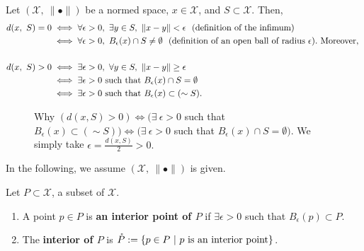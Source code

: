 \begin{lem} Let $\left(\mathcal{X},\ \| \bullet \|\right)$ be a normed space, $x\in\mathcal{X}$, and $S\subset\mathcal{X}$. Then,
    \begin{align*}
        d(x,\ S)=0 &\iff \forall\epsilon>0,\ \exists y\in S,\ \|x-y\|<\epsilon ~~(\text{definition of  the infimum})\\
        &\iff \forall\epsilon>0,\ B_\epsilon(x)\cap S\neq \emptyset ~~(\text{definition of an open ball of radius} ~\epsilon). \text{ Moreover, } \\
        \\
        d(x,\ S)>0 &\iff \exists\epsilon>0,\ \forall y\in S,\ \|x-y\|\geq\epsilon\\
        &\iff \exists\epsilon>0 \textnormal{ such that } B_\epsilon(x)\cap S = \emptyset\\
        &\iff  \exists\epsilon>0 \textnormal{ such that } B_\epsilon(x)\subset (\sim S).
    \end{align*}
\end{lem} 

\begin{figure}[hbt!]%
    \label{fig:DistanceZero2aSet}
\caption[]{ Why $(d(x, S)>0) \iff (\exists ~\epsilon>0$ such that $ B_\epsilon(x) \subset (\sim S)) \iff (\exists ~\epsilon>0$ such that $ B_\epsilon(x) \cap S = \emptyset)$. We simply take $\epsilon = \frac{d(x, S)}{2} >0.$ }
\end{figure} 


 In the following, we assume $\left(\mathcal{X},\ \| \bullet \|\right)$ is given.
 
\begin{definition} Let $P\subset\mathcal{X}$, a subset of $\mathcal{X}$. 
    \begin{enumerate}
          \renewcommand{\labelenumi}{(\alph{enumi})}
        \setlength{\itemsep}{.1cm} 
        \item A point $p\in P$ is \textbf{ an interior point of $P$} if $\exists\epsilon>0$ such that $B_\epsilon(p)\subset P$.
        \item The \textbf{interior of $P$} is $\mathring{P}:=\{p\in P\ |\ p\textnormal{ is an interior point}\}$.
            \end{enumerate}
\end{definition}

